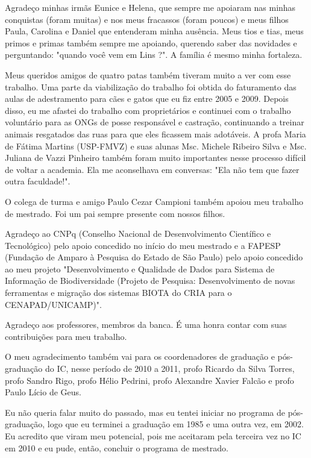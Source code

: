 Agradeço minhas irmãs Eunice e Helena, que sempre me apoiaram nas minhas conquistas (foram muitas) e nos meus fracassos (foram poucos) e meus filhos Paula, Carolina e Daniel que entenderam minha ausência. Meus tios e tias, meus primos e primas também sempre me apoiando, querendo saber das novidades e perguntando: "quando você vem em Lins ?". A família é mesmo minha fortaleza.

Meus queridos amigos de quatro patas também tiveram muito a ver com esse trabalho. Uma parte da viabilização do trabalho foi obtida do faturamento das aulas de adestramento para cães e gatos que eu fiz entre 2005 e 2009. Depois disso, eu me afastei do trabalho com proprietários e continuei com o trabalho voluntário para as ONGs de posse responsável e castração, continuando a treinar animais resgatados das ruas para que eles ficassem mais adotáveis. A profa Maria de Fátima Martins (USP-FMVZ) e suas alunas Msc. Michele Ribeiro Silva e Msc. Juliana de Vazzi Pinheiro também foram muito importantes nesse processo difícil de voltar a academia. Ela me aconselhava em conversas: "Ela não tem que fazer outra faculdade!".

O colega de turma e amigo Paulo Cezar Campioni também apoiou meu trabalho de mestrado. Foi um pai sempre presente com nossos filhos.

Agradeço ao CNPq (Conselho Nacional de Desenvolvimento Científico e Tecnológico) pelo apoio concedido no início do meu mestrado e a FAPESP (Fundação de Amparo à Pesquisa do Estado de São Paulo) pelo apoio concedido ao meu projeto "Desenvolvimento e Qualidade de Dados para Sistema de Informação de Biodiversidade (Projeto de Pesquisa: Desenvolvimento de novas ferramentas e migração dos sistemas BIOTA do CRIA para o CENAPAD/UNICAMP)".

Agradeço aos professores, membros da banca. É uma honra contar com suas contribuições para meu trabalho.

O meu agradecimento também vai para os coordenadores de graduação e pós-graduação do IC, nesse período de 2010 a 2011, profo Ricardo da Silva Torres, profo Sandro Rigo, profo Hélio Pedrini, profo Alexandre Xavier Falcão e profo Paulo Lício de Geus.

Eu não queria falar muito do passado, mas eu tentei iniciar no programa de pós-graduação, logo que eu terminei a graduação em 1985 e uma outra vez, em 2002. Eu acredito que viram meu potencial, pois me aceitaram pela terceira vez no IC em 2010 e eu pude, então, concluir o programa de mestrado.

